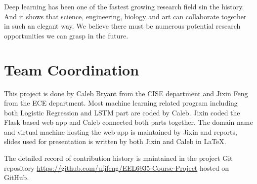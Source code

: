 \documentclass[conference]{IEEEtran}
\begin{document}
    Deep learning has been one of the fastest growing research field sin the history.
    And it shows that science, engineering, biology and art can collaborate together
    in such an elegant way. We believe there must be numerous potential research opportunities
    we can grasp in the future.


\section{Team Coordination}
\label{team}
    This project is done by Caleb Bryant from the CISE department and Jixin Feng from the ECE 
    department. Most machine learning related program including both Logistic 
    Regression and LSTM part are coded by Caleb. Jixin coded the Flask based web app
    and Caleb connected both parts together. The domain name and virtual machine hosting
    the web app is maintained by Jixin and reports, slides used for presentation
    is written by both Jixin and Caleb in \LaTeX.
    
    The detailed record of contribution history is maintained in the project Git repository
    \url{https://github.com/ufjfeng/EEL6935-Course-Project} hosted on GitHub.




\end{document}
